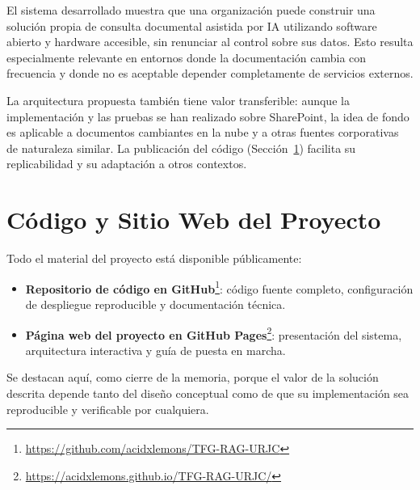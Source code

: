 El sistema desarrollado muestra que una organización puede construir una solución propia de consulta documental asistida por IA utilizando software abierto y hardware accesible, sin renunciar al control sobre sus datos. Esto resulta especialmente relevante en entornos donde la documentación cambia con frecuencia y donde no es aceptable depender completamente de servicios externos.

La arquitectura propuesta también tiene valor transferible: aunque la implementación y las pruebas se han realizado sobre SharePoint, la idea de fondo es aplicable a documentos cambiantes en la nube y a otras fuentes corporativas de naturaleza similar. La publicación del código (Sección~\ref{sec:codigo-web}) facilita su replicabilidad y su adaptación a otros contextos.

\section{Código y Sitio Web del Proyecto}
\label{sec:codigo-web}

Todo el material del proyecto está disponible públicamente:

\begin{itemize}
    \item \textbf{Repositorio de código en GitHub}\footnote{\url{https://github.com/acidxlemons/TFG-RAG-URJC}}: código fuente completo, configuración de despliegue reproducible y documentación técnica.
    \item \textbf{Página web del proyecto en GitHub Pages}\footnote{\url{https://acidxlemons.github.io/TFG-RAG-URJC/}}: presentación del sistema, arquitectura interactiva y guía de puesta en marcha.
\end{itemize}

Se destacan aquí, como cierre de la memoria, porque el valor de la solución descrita depende tanto del diseño conceptual como de que su implementación sea reproducible y verificable por cualquiera.
